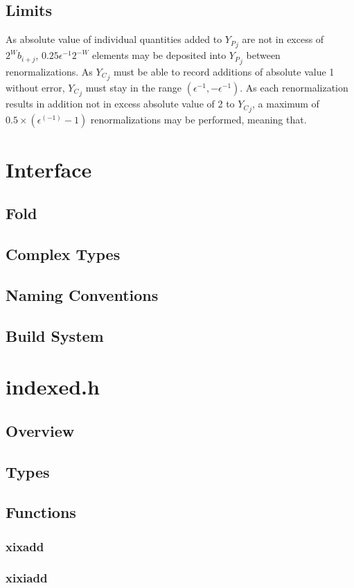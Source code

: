 \documentclass[12pt]{article}
\theoremstyle{plain}
\begin{document}
  \subsection{Limits}
    \label{sec:limits}
    As absolute value of individual quantities added to ${Y_P}_j$ are not in excess of $2^W b_{i + j}$, $0.25\epsilon^{-1}2^{-W}$ elements may be deposited into ${Y_P}_j$ between renormalizations. As ${Y_C}_j$ must be able to record additions of absolute value 1 without error, ${Y_C}_j$ must stay in the range $(\epsilon^{-1}, -\epsilon^{-1})$. As each renormalization results in addition not in excess absolute value of 2 to ${Y_C}_j$, a maximum of $0.5 \times (\epsilon^(-1) - 1)$ renormalizations may be performed, meaning that.
\section{Interface}
  \subsection{Fold}
  \subsection{Complex Types}
  \subsection{Naming Conventions}
  \subsection{Build System}
\section{indexed.h}
  \subsection{Overview}
  \subsection{Types}
  \subsection{Functions}
    \subsubsection{xixadd}
    \subsubsection{xixiadd}
\end{document}

